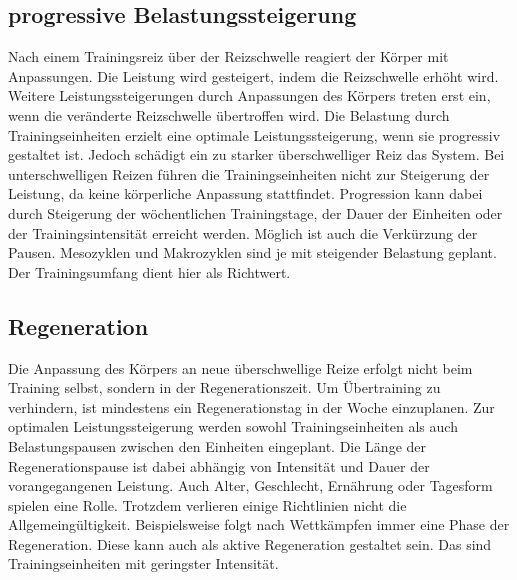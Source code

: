 \subsection{progressive Belastungssteigerung}
Nach einem Trainingsreiz über der Reizschwelle reagiert der Körper mit Anpassungen. Die Leistung wird gesteigert, indem die Reizschwelle erhöht wird. Weitere Leistungssteigerungen durch Anpassungen des Körpers treten erst ein, wenn die veränderte Reizschwelle übertroffen wird. Die Belastung durch Trainingseinheiten erzielt eine optimale Leistungssteigerung, wenn sie progressiv gestaltet ist. Jedoch schädigt ein zu starker überschwelliger Reiz das System. Bei unterschwelligen Reizen führen die Trainingseinheiten nicht zur Steigerung der Leistung, da keine körperliche Anpassung stattfindet. \cite[58]{Seidenspinner2005} Progression kann dabei durch Steigerung der wöchentlichen Trainingstage, der Dauer der Einheiten oder der Trainingsintensität erreicht werden. Möglich ist auch die Verkürzung der Pausen.\newline 
Mesozyklen und Makrozyklen sind je mit steigender Belastung geplant. Der Trainingsumfang dient hier als Richtwert. \cite[60-61]{Radsporttraining}
\subsection{Regeneration}
Die Anpassung des Körpers an neue überschwellige Reize erfolgt nicht beim Training selbst, sondern in der Regenerationszeit. Um Übertraining zu verhindern, ist mindestens ein Regenerationstag in der Woche einzuplanen. 
Zur optimalen Leistungssteigerung werden sowohl Trainingseinheiten als auch Belastungspausen zwischen den Einheiten eingeplant. Die Länge der Regenerationspause ist dabei abhängig von Intensität und Dauer der vorangegangenen Leistung. Auch Alter, Geschlecht, Ernährung oder Tagesform spielen eine Rolle. Trotzdem verlieren einige Richtlinien nicht die Allgemeingültigkeit. Beispielsweise folgt nach Wettkämpfen immer eine Phase der Regeneration. Diese kann auch als aktive Regeneration gestaltet sein. Das sind Trainingseinheiten mit geringster Intensität.
